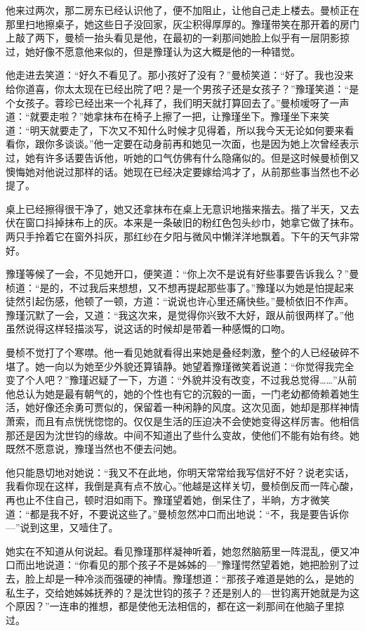 \par 他来过两次，那二房东已经认识他了，便不加阻止，让他自己走上楼去。曼桢正在那里扫地擦桌子，她这些日子没回家，灰尘积得厚厚的。豫瑾带笑在那开着的房门上敲了两下，曼桢一抬头看见是他，在最初的一刹那间她脸上似乎有一层阴影掠过，她好像不愿意他来似的，但是豫瑾认为这大概是他的一种错觉。
\par 他走进去笑道：“好久不看见了。那小孩好了没有？”曼桢笑道：“好了。我也没来给你道喜，你太太现在已经出院了吧？是一个男孩子还是女孩子？”豫瑾笑道：“是个女孩子。蓉珍已经出来一个礼拜了，我们明天就打算回去了。”曼桢嗳呀了一声道：“就要走啦？”她拿抹布在椅子上擦了一把，让豫瑾坐下。豫瑾坐下来笑道：“明天就要走了，下次又不知什么时候才见得着，所以我今天无论如何要来看看你，跟你多谈谈。”他一定要在动身前再和她见一次面，也是因为她上次曾经表示过，她有许多话要告诉他，听她的口气仿佛有什么隐痛似的。但是这时候曼桢倒又懊悔她对他说过那样的话。她现在已经决定要嫁给鸿才了，从前那些事当然也不必提了。
\par 桌上已经擦得很干净了，她又还拿抹布在桌上无意识地揩来揩去。揩了半天，又去伏在窗口抖掉抹布上的灰。本来是一条破旧的粉红色包头纱巾，她拿它做了抹布。两只手拎着它在窗外抖灰，那红纱在夕阳与微风中懒洋洋地飘着。下午的天气非常好。
\par 豫瑾等候了一会，不见她开口，便笑道：“你上次不是说有好些事要告诉我么？”曼桢道：“是的，不过我后来想想，又不想再提起那些事了。”豫瑾以为她是怕提起来徒然引起伤感，他顿了一顿，方道：“说说也许心里还痛快些。”曼桢依旧不作声。豫瑾沉默了一会，又道：“我这次来，是觉得你兴致不大好，跟从前很两样了。”他虽然说得这样轻描淡写，说这话的时候却是带着一种感慨的口吻。
\par 曼桢不觉打了个寒噤。他一看见她就看得出来她是叠经刺激，整个的人已经破碎不堪了。她一向以为她至少外貌还算镇静。她望着豫瑾微笑着说道：“你觉得我完全变了个人吧？”豫瑾迟疑了一下，方道：“外貌并没有改变，不过我总觉得……”从前他总认为她是最有朝气的，她的个性也有它的沉毅的一面，一门老幼都倚赖着她生活，她好像还余勇可贾似的，保留着一种闲静的风度。这次见面，她却是那样神情萧索，而且有点恍恍惚惚的。仅仅是生活的压迫决不会使她变得这样厉害。他相信那还是因为沈世钧的缘故。中间不知道出了些什么变故，使他们不能有始有终。她既然不愿意说，豫瑾当然也不便去问她。
\par 他只能恳切地对她说：“我又不在此地，你明天常常给我写信好不好？说老实话，我看你现在这样，我倒是真有点不放心。”他越是这样关切，曼桢倒反而一阵心酸，再也止不住自己，顿时泪如雨下。豫瑾望着她，倒呆住了，半晌，方才微笑道：“都是我不好，不要说这些了。”曼桢忽然冲口而出地说：“不，我是要告诉你—”说到这里，又噎住了。
\par 她实在不知道从何说起。看见豫瑾那样凝神听着，她忽然脑筋里一阵混乱，便又冲口而出地说道：“你看见的那个孩子不是姊姊的—”豫瑾愕然望着她，她把脸别了过去，脸上却是一种冷淡而强硬的神情。豫瑾想道：“那孩子难道是她的么，是她的私生子，交给她姊姊抚养的？是沈世钧的孩子？还是别人的—世钧离开她就是为这个原因？”一连串的推想，都是使他无法相信的，都在这一刹那间在他脑子里掠过。
